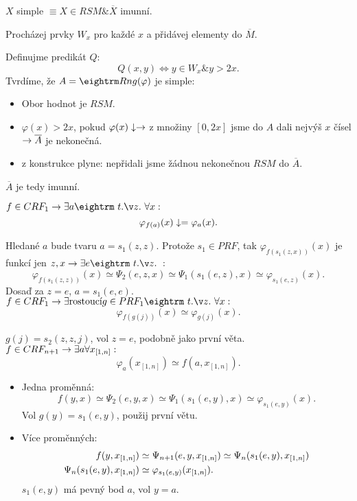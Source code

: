 \begin{multicols}{3}
\dfn{} $X$ simple $\equiv X \in RSM \& \overline{X}$ imunní.

 Procházej prvky $W_x$ pro každé $x$ a přidávej elementy do $\overline{M}$.

 Definujme predikát $Q$:
$$ Q(x,y) \iff y \in W_x \& y > 2x.$$
Tvrdíme, že $A = \rng(\varphi)$ je simple:

\begin{itemize}
\item Obor hodnot \CRF je $RSM$.
\item $\varphi(x) > 2x$, pokud $\varphi(x) \downarrow \rightarrow$ z množiny $[0,2x]$ jsme do $A$ dali nejvýš $x$ čísel $\rightarrow \overline{A}$
je nekonečná.
\item z konstrukce plyne: nepřidali jsme žádnou nekonečnou $RSM$ do $\overline{A}$.
\end{itemize}

$\overline{A}$ je tedy imunní.


 $f \in CRF_1 \then \exists a \st \forall x:$
$$\varphi_{f(a)}(x) \downarrow= \varphi_a(x).$$

\prf{} Hledané $a$ bude tvaru $a = s_1(z,z)$. Protože $s_1 \in PRF$, tak $\varphi_{f(s_1(z,x))}(x)$
je funkcí jen $z,x \then \exists e \st:$
$$\varphi_{f(s_1(z,z))}(x) \simeq \Psi_2(e,z,x) \simeq \Psi_1(s_1(e,z),x) \simeq \varphi_{s_1(e,z)}(x).$$
Dosaď za $z = e$, $a = s_1(e,e)$.
\goodbreak
{} $f \in CRF_1 \then \exists \text{rostoucí} g \in PRF_1 \st \forall x:$
$$ \varphi_{f(g(j))}(x) \simeq \varphi_{g(j)}(x).$$

\prf{} $g(j) = s_2(z,z,j)$, vol $z = e$, podobně jako první věta.
\goodbreak
{}
$f \in CRF_{n+1} \rightarrow \exists a \forall x_{[1,n]}:$
$$ \varphi_a(x_{[1,n]}) \simeq f(a,x_{[1,n]}).$$

\prf{}
\begin{itemize}
\item Jedna proměnná: $$f(y,x) \simeq \Psi_2(e,y,x) \simeq \Psi_1(s_1(e,y),x) \simeq \varphi_{s_1(e,y)}(x).$$
Vol $g(y) = s_1(e,y)$, použij první větu.
\item Více proměnných:
\begin{align*}
f(y,x_{[1,n]} ) &\simeq \Psi_{n+1}(e,y,x_{[1,n]} ) \simeq \Psi_n(s_1(e,y), x_{[1,n]} )\\
\Psi_n(s_1(e,y), x_{[1,n]} ) &\simeq \varphi_{s_1(e,y)}(x_{[1,n]} ).
\end{align*}
$s_1(e,y)$ má pevný bod $a$, vol $y = a$.
\end{itemize}


\end{multicols}

